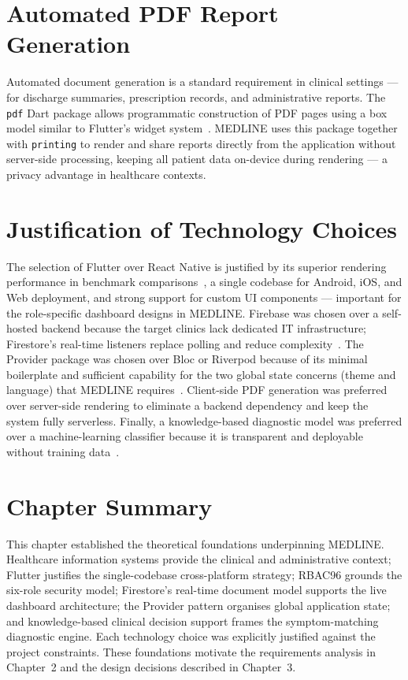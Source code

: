 \documentclass[12pt,a4paper,oneside]{report}
\begin{document}
\section{Automated PDF Report Generation}

Automated document generation is a standard requirement in clinical settings
--- for discharge summaries, prescription records, and administrative reports.
The \texttt{pdf} Dart package allows programmatic construction of PDF pages
using a box model similar to Flutter's widget system~\cite{pdfpkg2024}. MEDLINE
uses this package together with \texttt{printing} to render and share reports
directly from the application without server-side processing, keeping all
patient data on-device during rendering --- a privacy advantage in healthcare
contexts.

\section{Justification of Technology Choices}

The selection of Flutter over React Native is justified by its superior
rendering performance in benchmark comparisons~\cite{nawrocki2021}, a single
codebase for Android, iOS, and Web deployment, and strong support for custom UI
components --- important for the role-specific dashboard designs in MEDLINE.
Firebase was chosen over a self-hosted backend because the target clinics lack
dedicated IT infrastructure; Firestore's real-time listeners replace polling
and reduce complexity~\cite{firebase2024}. The Provider package was chosen over
Bloc or Riverpod because of its minimal boilerplate and sufficient capability
for the two global state concerns (theme and language) that MEDLINE
requires~\cite{provider2024}. Client-side PDF generation was preferred over
server-side rendering to eliminate a backend dependency and keep the system
fully serverless. Finally, a knowledge-based diagnostic model was preferred
over a machine-learning classifier because it is transparent and deployable
without training data~\cite{sutton2020}.

\section{Chapter Summary}

This chapter established the theoretical foundations underpinning MEDLINE.
Healthcare information systems provide the clinical and administrative context;
Flutter justifies the single-codebase cross-platform strategy; RBAC96 grounds
the six-role security model; Firestore's real-time document model supports the
live dashboard architecture; the Provider pattern organises global application
state; and knowledge-based clinical decision support frames the
symptom-matching diagnostic engine. Each technology choice was explicitly
justified against the project constraints. These foundations motivate the
requirements analysis in Chapter~2 and the design decisions described in
Chapter~3.
\end{document}
